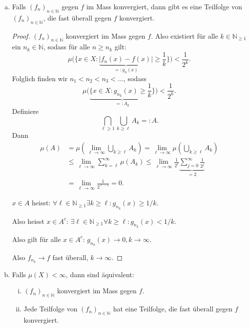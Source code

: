 \documentclass[10pt]{article}\usepackage[]{graphicx}\usepackage[]{color}
\newcommand{\N}{\mathbb{N}}
\begin{document}
\begin{enumerate}[(a)]
  \item Falls $(f_n)_{n \in \N}$ gegen $f$ im Mass konvergiert,
        dann gibt es eine Teilfolge von $(f_n)_{n \in \N}$,
        die fast überall gegen $f$ konvergiert.
  \begin{proof}
    $(f_n)_{n\in \N}$ konvergiert im Mass gegen $f$.
    Also existiert für alle $k \in \N_{\geq 1}$
    ein $n_k \in \N$, sodass für alle $n \geq n_k$ gilt: 
    \[
      \mu\bigg(\bigg\{x \in X : \underbrace{|f_n(x) - f(x)|}_{=: g_n(x)} \geq \frac{1}{k}\bigg\}\bigg) < \frac{1}{2^k}.
    \]
    Folglich finden wir $n_1 < n_2 < n_3 < \dots$, sodass
    \[
      \mu\bigg(\underbrace{\bigg\{x \in X : g_{n_k}(x) \geq \frac{1}{k}\bigg\}}_{=: A_k}\bigg) < \frac{1}{2^k}.
    \]
    Definiere
    \[
      \bigcap_{\ell \geq 1}\bigcup_{k \geq \ell} A_k =: A.
    \]
    Dann
    \begin{align*}
      \mu(A) 
      &= \mu\left(\lim_{\ell \to \infty} \bigcup_{k \geq \ell} A_k\right)
      = \lim_{\ell \to \infty} \mu\left(\bigcup_{k \geq \ell} A_k\right) \\
      &\leq \lim_{\ell \to \infty} \sum_{k = \ell}^{\infty} \mu(A_k)
      \leq \lim_{\ell \to \infty} \frac{1}{2^{\ell}}\underbrace{\sum_{j = 0}^{\infty} \frac{1}{2^j}}_{= 2} \\
      &= \lim_{\ell \to \infty}  \frac{1}{2^{\ell - 1}}
      = 0.
    \end{align*}
    
    $x \in A$ heisst: $\forall \ell \in \N_{\geq 1} \exists k \geq \ell: g_{n_k}(x) \geq 1/k$.
    
    Also heisst $x \in A^c$: $\exists \ell \in \N_{\geq 1} \forall k \geq \ell: g_{n_k}(x) < 1/k$.
    
    Also gilt für alle $x \in A^c$: $g_{n_k}(x) \to 0, k \to \infty$.
    
    Also $f_{n_k} \to f$ fast überall, $k \to \infty$.
  \end{proof}

  \item Falls $\mu(X) < \infty$, dann sind äquivalent:
  \begin{enumerate}[(i)]
    \item $(f_n)_{n \in \N}$ konvergiert im Mass gegen $f$.

    \item Jede Teilfolge von $(f_n)_{n \in \N}$ hat eine
          Teilfolge, die fast überall gegen $f$ konvergiert.
  \end{enumerate}


\end{enumerate}
\end{document}
